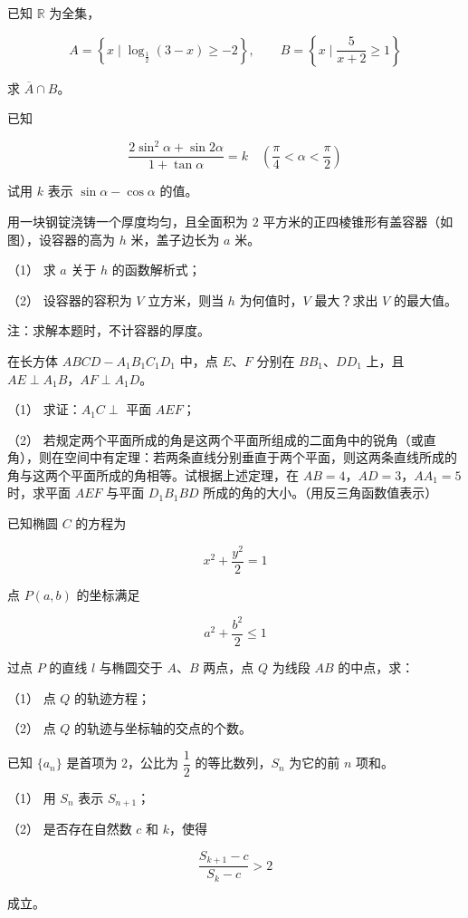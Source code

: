 \begin{question}
已知 $\mathbb R$ 为全集，

\nopagebreak[4]
\[
A=\left\{x\mid\log_{\frac12}(3-x)\ge-2\right\},\qquad
B=\left\{x\mid\dfrac5{x+2}\ge1\right\}
\]

求 $\overline A\cap B$。

\end{question}
\begin{question}
已知

\nopagebreak[4]
\[
\dfrac{2\sin^2\alpha+\sin2\alpha}{1+\tan\alpha}=k
\quad\left(\dfrac\pi4<\alpha<\dfrac\pi2\right)
\]

试用 $k$ 表示 $\sin\alpha-\cos\alpha$ 的值。

\Needspace{0.4\textheight}
\end{question}
\begin{question}
用一块钢锭浇铸一个厚度均匀，且全面积为 $2$ 平方米的正四棱锥形有盖容器（如图），设容器的高为 $h$ 米，盖子边长为 $a$ 米。
\nopagebreak[4]
\begin{center}\end{center}
\nopagebreak[4]
（1） 求 $a$ 关于 $h$ 的函数解析式；

（2） 设容器的容积为 $V$ 立方米，则当 $h$ 为何值时，$V$ 最大？求出 $V$ 的最大值。

注：求解本题时，不计容器的厚度。

\Needspace{0.4\textheight}
\end{question}
\begin{question}
在长方体 $ABCD-A_1B_1C_1D_1$ 中，点 $E\text{、}F$ 分别在 $BB_1\text{、}DD_1$ 上，且 $AE\perp A_1B$，$AF\perp A_1D$。
\nopagebreak[4]
\begin{center}\end{center}
\nopagebreak[4]
（1） 求证：$A_1C\perp$ 平面 $AEF$；

（2） 若规定两个平面所成的角是这两个平面所组成的二面角中的锐角（或直角），则在空间中有定理：若两条直线分别垂直于两个平面，则这两条直线所成的角与这两个平面所成的角相等。试根据上述定理，在 $AB=4$，$AD=3$，$AA_1=5$ 时，求平面 $AEF$ 与平面 $D_1B_1BD$ 所成的角的大小。（用反三角函数值表示）

\end{question}
\begin{question}
已知椭圆 $C$ 的方程为

\nopagebreak[4]
\[
x^2+\dfrac{y^2}{2}=1
\]

点 $P(a,b)$ 的坐标满足

\nopagebreak[4]
\[
a^2+\dfrac{b^2}{2}\le1
\]

过点 $P$ 的直线 $l$ 与椭圆交于 $A\text{、}B$ 两点，点 $Q$ 为线段 $AB$ 的中点，求：

（1） 点 $Q$ 的轨迹方程；

（2） 点 $Q$ 的轨迹与坐标轴的交点的个数。

\end{question}
\begin{question}
已知 $\{a_n\}$ 是首项为 $2$，公比为 $\dfrac12$ 的等比数列，$S_n$ 为它的前 $n$ 项和。

（1） 用 $S_n$ 表示 $S_{n+1}$；

（2） 是否存在自然数 $c$ 和 $k$，使得

\nopagebreak[4]
\[
\dfrac{S_{k+1}-c}{S_k-c}>2
\]

成立。

\end{question}